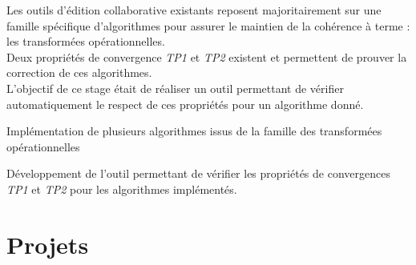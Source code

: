 \documentclass[]{deedy-resume-openfont}
\begin{document}
\sectionsep

\hfill\begin{minipage}{\dimexpr\textwidth-0.5cm}
Les outils d'édition collaborative existants reposent majoritairement sur une famille spécifique d'algorithmes
pour assurer le maintien de la cohérence à terme : les transformées opérationnelles.
\\
Deux propriétés de convergence \emph{TP1} et \emph{TP2} existent et permettent de prouver la correction de ces algorithmes.
\\
L'objectif de ce stage était de réaliser un outil permettant de vérifier automatiquement le respect de ces propriétés pour un algorithme donné.
\begin{tightemize}
\item Implémentation de plusieurs algorithmes issus de la famille des transformées opérationnelles
\item Développement de l'outil permettant de vérifier les propriétés de convergences \emph{TP1} et \emph{TP2} pour les algorithmes implémentés.
\end{tightemize}
\sectionsep\xdef\tpd{\the\prevdepth}
\end{minipage}

\section{Projets}
\end{document}
